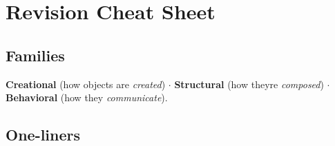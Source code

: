 \documentclass[11pt]{article}
\begin{document}
\section{Revision Cheat Sheet}\label{revision-cheat-sheet}

\subsection{Families}\label{families}

\textbf{Creational} (how objects are \emph{created}) \(\cdot\) \textbf{Structural} (how they\textquotesingle re \emph{composed}) \(\cdot\) \textbf{Behavioral} (how they \emph{communicate}).

\subsection{One-liners}\label{one-liners}
\end{document}
